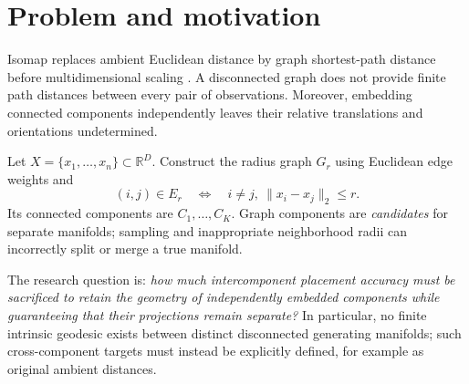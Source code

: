 \section{Problem and motivation}
Isomap replaces ambient Euclidean distance by graph shortest-path distance
before multidimensional scaling \cite{tenenbaum2000}. A disconnected graph
does not provide finite path distances between every pair of observations.
Moreover, embedding connected components independently leaves their relative
translations and orientations undetermined.

Let $X=\{x_1,\ldots,x_n\}\subset\mathbb{R}^{D}$. Construct the radius
graph $G_r$ using Euclidean edge weights and
\[
  (i,j)\in E_r \quad\Longleftrightarrow\quad
  i\ne j,\ \|x_i-x_j\|_2\le r .
\]
Its connected components are $C_1,\ldots,C_K$. Graph components are
\emph{candidates} for separate manifolds; sampling and inappropriate
neighborhood radii can incorrectly split or merge a true manifold.

The research question is: \emph{how much intercomponent placement accuracy
must be sacrificed to retain the geometry of independently embedded
components while guaranteeing that their projections remain separate?}
In particular, no finite intrinsic geodesic exists between distinct
disconnected generating manifolds; such cross-component targets must
instead be explicitly defined, for example as original ambient distances.
